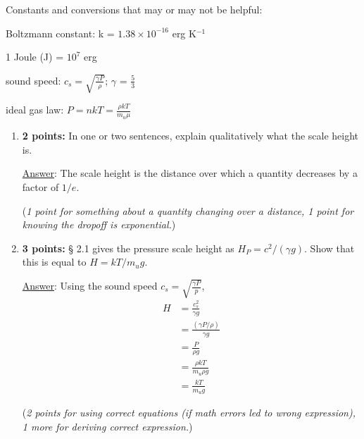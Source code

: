 \documentclass[12pt]{article}
\begin{document}
Constants and conversions that may or may not be helpful:
\begin{itemize*}
    \item Boltzmann constant: k = $1.38\times10^{-16}$ erg K$^{-1}$
    \item 1 Joule (J) = $10^{7}$ erg
    \item sound speed: $c_s = \sqrt{\frac{\gamma{P}}{\rho}}$;
        $\gamma$ = $\frac{5}{3}$
    \item ideal gas law: $P = nkT = \frac{\rho{kT}}{m_u{\mu}}$
\end{itemize*}


\begin{enumerate}
        \begin{enumerate}
            \item \textbf{2 points:} In one or two sentences, explain
                qualitatively what the scale height is.

                {\small\underline{Answer}: The scale height is the distance
                    over which a quantity decreases by a factor of $1/e$.

                (\emph{1 point for something about a quantity changing over
                a distance, 1 point for knowing the dropoff is exponential.})}

            \item \textbf{3 points:} \S{} 2.1 gives the pressure scale
                height as $H_{P} = c^2/(\gamma{g})$. Show that this is
                equal to $H = kT/m_{u}g$.

                {\small\underline{Answer}:
                    Using the sound speed $c_s = \sqrt{\frac{\gamma{P}}{p}}$,
                    \begin{align*}
                        H &= \frac{c_s^2}{\gamma{g}} \\
                          &= \frac{(\gamma{P}/\rho)}{\gamma{g}} \\
                         &= \frac{P}{\rho{g}} \\
                         &= \frac{\rho{kT}}{m_u\rho{g}} \\
                         &= \frac{kT}{m_u{g}}
                    \end{align*}

                (\emph{2 points for using correct equations (if math errors
                led to wrong expression), 1 more for deriving
                correct expression.})}

        \end{enumerate}
\end{enumerate}


\end{document}
